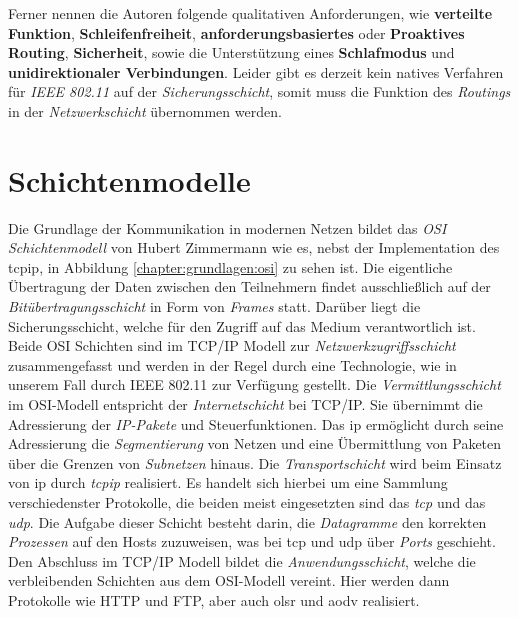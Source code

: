 Ferner nennen die Autoren folgende qualitativen Anforderungen, wie \textbf{verteilte Funktion}, \textbf{Schleifenfreiheit}, \textbf{anforderungsbasiertes} oder \textbf{Proaktives Routing}, \textbf{Sicherheit}, sowie die Unterstützung eines \textbf{Schlafmodus}
und \textbf{unidirektionaler Verbindungen}. Leider gibt es derzeit kein  natives Verfahren für \textit{IEEE 802.11} auf der \textit{Sicherungsschicht}, somit muss die Funktion des \textit{Routings} in der \textit{Netzwerkschicht} übernommen werden.

\section{Schichtenmodelle}
\label{chapter:network:osi}

Die Grundlage der Kommunikation in modernen Netzen bildet das \textit{OSI Schichtenmodell} von Hubert Zimmermann \cite{Zimmermann80} wie es, nebst der Implementation des \gls{tcpip}, in Abbildung \ref{chapter:grundlagen:osi} zu sehen ist. Die eigentliche Übertragung der Daten zwischen den Teilnehmern findet ausschließlich auf der \textit{Bitübertragungsschicht} in Form von \textit{Frames} statt. Darüber liegt die Sicherungsschicht, welche für den Zugriff auf das Medium verantwortlich ist. Beide OSI Schichten sind im TCP/IP Modell zur \textit{Netzwerkzugriffsschicht} zusammengefasst und werden in der Regel durch eine Technologie, wie in unserem Fall durch IEEE 802.11 zur Verfügung gestellt. Die \textit{Vermittlungsschicht} im OSI-Modell entspricht der \textit{Internetschicht} bei TCP/IP. Sie übernimmt die Adressierung der \textit{IP-Pakete} und Steuerfunktionen. Das \gls{ip} ermöglicht durch seine Adressierung die \textit{Segmentierung} von Netzen und eine Übermittlung von Paketen über die Grenzen von \textit{Subnetzen} hinaus. Die \textit{Transportschicht} wird beim Einsatz von \gls{ip} durch \textit{\gls{tcpip}} realisiert. Es handelt sich hierbei um eine Sammlung verschiedenster Protokolle, die beiden meist eingesetzten sind das \textit{\gls{tcp}} und das \textit{\gls{udp}}. Die Aufgabe dieser Schicht besteht darin, die \textit{Datagramme} den korrekten \textit{Prozessen} auf den Hosts zuzuweisen, was bei \gls{tcp} und \gls{udp} über \textit{Ports} geschieht. Den Abschluss im TCP/IP Modell bildet die \textit{Anwendungsschicht}, welche die verbleibenden Schichten aus dem OSI-Modell vereint. Hier werden dann Protokolle wie \zB HTTP und FTP, aber auch \gls{olsr} und \gls{aodv} realisiert.\newline


